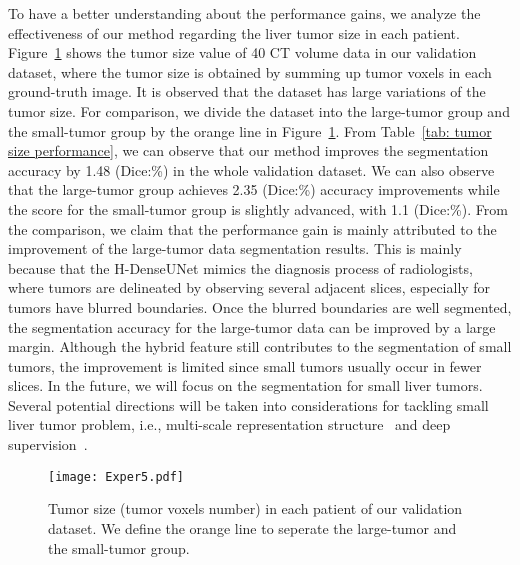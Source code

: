 \documentclass[journal]{IEEEtran}
\begin{document}
To have a better understanding about the performance gains, we analyze the effectiveness of our method regarding the liver tumor size in each patient.
Figure~\ref{fig:voxels} shows the tumor size value of 40 CT volume data in our validation dataset, where the tumor size is obtained by summing up tumor voxels in each ground-truth image. It is observed that the dataset has large variations of the tumor size.
For comparison, we divide the dataset into the large-tumor group and the small-tumor group by the orange line in Figure~\ref{fig:voxels}.
From Table~\ref{tab: tumor size performance}, we can observe that our method improves the segmentation accuracy by 1.48 (Dice:\%) in the whole validation dataset. We can also observe that the large-tumor group achieves 2.35 (Dice:\%) accuracy improvements while the score for the small-tumor group is slightly advanced, with 1.1 (Dice:\%).
From the comparison, we claim that the performance gain is mainly attributed to the improvement of the large-tumor data segmentation results.
This is mainly because that the H-DenseUNet mimics the diagnosis process of radiologists, where tumors are delineated by observing several adjacent slices, especially for tumors have blurred boundaries. Once the blurred boundaries are well segmented, the segmentation accuracy for the large-tumor data can be improved by a large margin.
Although the hybrid feature still contributes to the segmentation of small tumors, the improvement is limited since small tumors usually occur in fewer slices.
In the future, we will focus on the segmentation for small liver tumors. Several potential directions will be taken into considerations for tackling small liver tumor problem, i.e., multi-scale representation structure~\cite{kamnitsas2017efficient} and deep supervision~\cite{dou20163d}.~
\begin{figure}[!t]
	\centering
	\texttt{[image: Exper5.pdf]}
	\caption{Tumor size (tumor voxels number) in each patient of our validation dataset. We define the orange line to seperate the large-tumor and the small-tumor group.}
	\label{fig:voxels}\centering
\end{figure}
\end{document}
